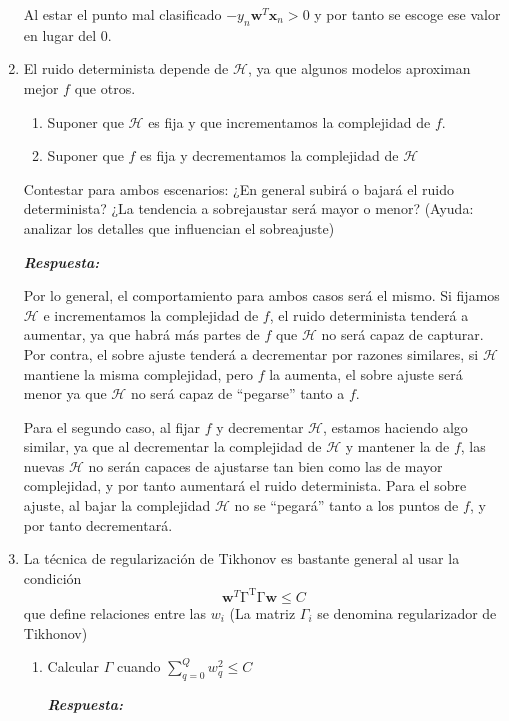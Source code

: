\documentclass[  DIV=calc,%
paper=a4,%
fontsize=11pt]{scrartcl}             %
\newcommand{\miit}[1]{{\textbf{\textit{#1}}}}
\begin{document}
\begin{enumerate}
    Al estar el punto mal clasificado $-y_n\textbf{w}^T\textbf{x}_n > 0 $ y por tanto se escoge ese valor en lugar del $0$.


    \item El ruido determinista depende de $\mathcal{H}$, ya que algunos modelos aproximan mejor $f$ que otros.
    \begin{enumerate}
      \item Suponer que $\mathcal{H}$ es fija y que incrementamos la complejidad de $f$.
      \item Suponer que $ f$ es fija y decrementamos la complejidad de $\mathcal{H}$
    \end{enumerate}
    Contestar para ambos escenarios: ¿En general subirá o bajará el ruido determinista? ¿La tendencia a sobrejaustar será mayor o menor? (Ayuda: analizar los detalles que influencian el sobreajuste)

    \miit{Respuesta:}

    Por lo general, el comportamiento para ambos casos será el mismo. Si fijamos $\mathcal{H}$ e incrementamos la complejidad de $f$, el ruido
    determinista tenderá a aumentar,  ya que habrá más partes de $f$ que $\mathcal{H}$ no será capaz de capturar. Por contra, el sobre ajuste tenderá
    a decrementar por razones similares, si $\mathcal{H}$ mantiene la misma complejidad, pero $f$ la aumenta, el sobre ajuste será menor ya que
    $\mathcal{H}$ no será capaz de “pegarse” tanto a $f$.

    Para el segundo caso, al fijar $f$ y decrementar $\mathcal{H}$, estamos haciendo algo similar, ya que al decrementar la complejidad de
    $\mathcal{H}$ y mantener la de $f$, las nuevas $\mathcal{H}$ no serán capaces de ajustarse tan bien como las de mayor complejidad, y por tanto
    aumentará el ruido determinista. Para el sobre ajuste, al bajar la complejidad $\mathcal{H}$ no se “pegará” tanto a los puntos de $f$, y por tanto
    decrementará.

    \item La técnica de regularización de Tikhonov es bastante general al usar la condición
    \[
      \textbf{w}^T\mathrm{\Gamma^T\Gamma}\textbf{w}\leq C
    \]
    que define relaciones entre las $w_i$ (La matriz $\Gamma_i$ se denomina regularizador de Tikhonov)
    \begin{enumerate}
      \item Calcular $\Gamma$ cuando $\sum_{q=0}^Q w_q^2 \leq C$

      \miit{Respuesta:}


\end{enumerate}
\end{enumerate}
\end{document}
